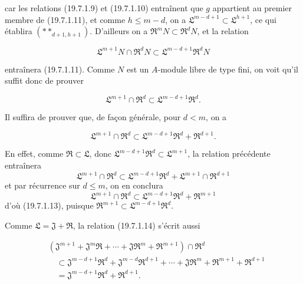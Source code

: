
car les relations (19.7.1.9) et (19.7.1.10) entraînent que $g$ appartient au premier membre de (19.7.1.11), et comme $h\leq m-d$, on a $\mathfrak L^{m-d+1}\subset\mathfrak L^{h+1}$, ce qui établira $(**_{d+1,h+1})$. D'ailleurs on a $\mathfrak R^mN\subset\mathfrak R^dN$, et la relation
\begin{env}[19.7.1.12]
\label{IV.19.7.1.12}
\[
  \mathfrak L^{m+1}N\cap\mathfrak R^dN\subset\mathfrak L^{m-d+1}\mathfrak R^dN
\]
\end{env}
entraînera (19.7.1.11). Comme $N$ est un $A$-module libre de type fini, on voit qu'il suffit donc de prouver
\begin{env}[19.7.1.13]
\label{IV.19.7.1.13}
\[
  \mathfrak L^{m+1}\cap\mathfrak R^d\subset\mathfrak L^{m-d+1}\mathfrak R^d.
\]
\end{env}

Il suffira de prouver que, de façon générale, pour $d<m$, on a
\begin{env}[19.7.1.14]
\label{IV.19.7.1.14}
\[
  \mathfrak L^{m+1}\cap\mathfrak R^d\subset\mathfrak L^{m-d+1}\mathfrak R^d+\mathfrak R^{d+1}.
\]
\end{env}
En effet, comme $\mathfrak R\subset\mathfrak L$, donc $\mathfrak L^{m-d+1}\mathfrak R^d\subset\mathfrak L^{m+1}$, la relation précédente entraînera
\[
  \mathfrak L^{m+1}\cap\mathfrak R^d\subset\mathfrak L^{m-d+1}\mathfrak R^d+\mathfrak L^{m+1}\cap\mathfrak R^{d+1}
\]
et par récurrence sur $d\leq m$, on en conclura
\[
  \mathfrak L^{m+1}\cap\mathfrak R^d\subset\mathfrak L^{m-d+1}\mathfrak R^d+\mathfrak R^{m+1}
\]
d'où (19.7.1.13), puisque $\mathfrak R^{m+1}\subset\mathfrak L^{m-d+1}\mathfrak R^d$.

Comme $\mathfrak L=\mathfrak J+\mathfrak R$, la relation (19.7.1.14) s'écrit aussi
\begin{env}[19.7.1.15]
\label{IV.19.7.1.15}
\[
\begin{aligned}
  &(\mathfrak J^{m+1}+\mathfrak J^m\mathfrak R+\cdots+\mathfrak J\mathfrak R^m+\mathfrak R^{m+1})\cap\mathfrak R^d\\
  &\quad\subset\mathfrak J^{m-d+1}\mathfrak R^d+\mathfrak J^{m-d}\mathfrak R^{d+1}+\cdots+\mathfrak J\mathfrak R^m+\mathfrak R^{m+1}+\mathfrak R^{d+1}\\
  &\quad=\mathfrak J^{m-d+1}\mathfrak R^d+\mathfrak R^{d+1}.
\end{aligned}
\]
\end{env}

